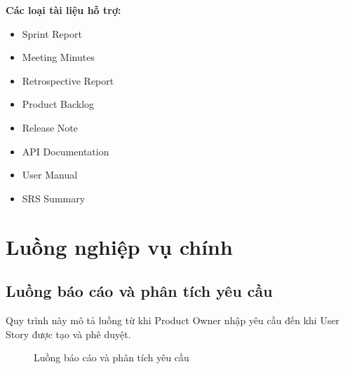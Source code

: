 \documentclass[12pt,a4paper]{report}
\begin{document}
\textbf{Các loại tài liệu hỗ trợ:}

\begin{itemize}
\item Sprint Report
\item Meeting Minutes
\item Retrospective Report
\item Product Backlog
\item Release Note
\item API Documentation
\item User Manual
\item SRS Summary
\end{itemize}

\section{Luồng nghiệp vụ chính}

\subsection{Luồng báo cáo và phân tích yêu cầu}

Quy trình này mô tả luồng từ khi Product Owner nhập yêu cầu đến khi User Story được tạo và phê duyệt.

\begin{figure}[H]
\centering
{}
\caption{Luồng báo cáo và phân tích yêu cầu}
\label{fig:requirement_flow}
\end{figure}
\end{document}
